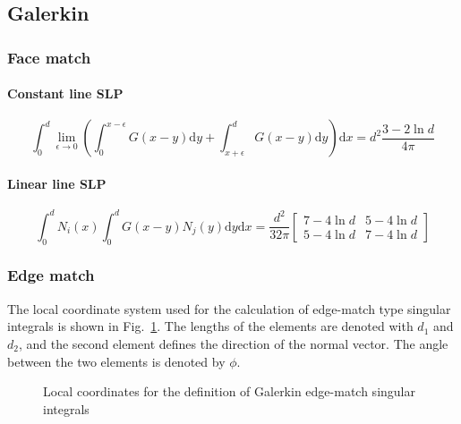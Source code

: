 \documentclass[a4paper,11pt]{article}
\newcommand{\td}{\mathrm{d}}
\begin{document}
\subsection{Galerkin}

\subsubsection{Face match}

\paragraph{Constant line SLP}

\begin{equation}
\int_{0}^{d}
\lim_{\epsilon \to 0}
\left(
\int_{0}^{x-\epsilon} G(x-y) \td y
+
\int_{x+\epsilon}^{d} G(x-y) \td y
\right)
\td x
=
d^2\frac{3-2\ln d}{4\pi}
\end{equation}

\paragraph{Linear line SLP}

\begin{equation}
\int_{0}^{d} N_i(x) \int_{0}^{d} G(x-y) N_j(y) \td y \td x
=
\frac{d^2}{32\pi} \begin{bmatrix}
7-4 \ln d & 5 - 4 \ln d \\
5-4 \ln d & 7 - 4 \ln d
\end{bmatrix}
\end{equation}

\subsubsection{Edge match}

The local coordinate system used for the calculation of edge-match type singular integrals is shown in Fig.~\ref{fig:local_galerkin_edge}. The lengths of the elements are denoted with $d_1$ and $d_2$, and the second element defines the direction of the normal vector. The angle between the two elements is denoted by $\phi$.

\begin{figure}
\center
{}
\caption{Local coordinates for the definition of Galerkin edge-match singular integrals}
\label{fig:local_galerkin_edge}
\end{figure}
\end{document}
